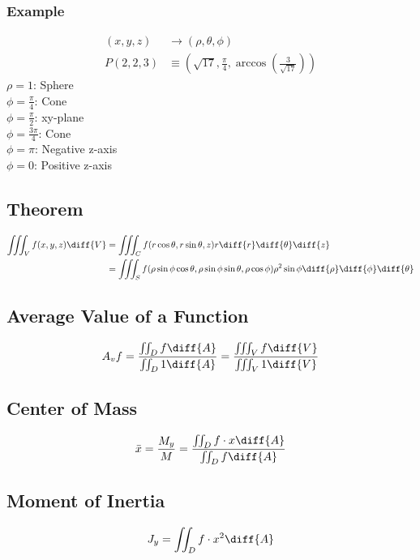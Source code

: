 \documentclass{math}
\begin{document}
\subsubsection*{Example}
\begin{align*}
  (x,y,z) &\to (\rho,\theta,\phi) \\
  P(2,2,3) &\equiv\left(
    \sqrt{17},\frac{\pi}{4},\arccos\left(\frac{3}{\sqrt{17}}\right)\right)
\end{align*}
\( \rho = 1 \): Sphere \\
\( \phi = \frac{\pi}{4} \): Cone \\
\( \phi = \frac{\pi}{2} \): xy-plane \\
\( \phi = \frac{3\pi}{4} \): Cone \\
\( \phi = \pi \): Negative z-axis \\
\( \phi = 0 \): Positive z-axis

\subsection*{Theorem}
\begin{align*}
  \iiint_{V}f(x,y,z)\diff{V} &= \iiint_{C}f(r\cos\theta,r\sin\theta,z)r
    \diff{r}\diff{\theta}\diff{z} \\
  &= \iiint_{S}f(\rho\sin\phi\cos\theta,\rho\sin\phi\sin\theta,\rho\cos\phi)
    \rho^2\sin\phi\diff{\rho}\diff{\phi}\diff{\theta} \\
\end{align*}

\subsection*{Average Value of a Function}
\[ A_vf = \frac{\iint_{D}f\diff{A}}{\iint_{D}1\diff{A}} =
  \frac{\iiint_{V}f\diff{V}}{\iiint_{V}1\diff{V}} \]

\subsection*{Center of Mass}
\[ \bar{x} = \frac{M_y}{M} =
  \frac{\iint_{D}f\cdot x\diff{A}}{\iint_{D}f\diff{A}} \]

\subsection*{Moment of Inertia}
\[ J_y = \iint_{D}f\cdot x^2\diff{A} \]
\end{document}
